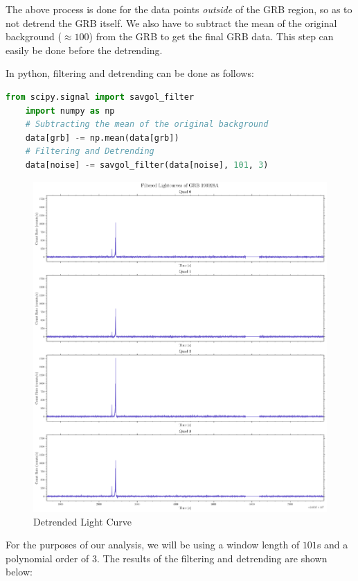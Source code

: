 \documentclass[11pt]{book} %
\begin{document}
The above process is done for the data points \textit{outside} of the GRB region, so as to not detrend the GRB itself. We also have to subtract the mean of the original background ($\approx 100$) from the GRB to get the final GRB data. This step can easily be done before the detrending.

In python, filtering and detrending can be done as follows:

\begin{lstlisting}[language=Python]
    from scipy.signal import savgol_filter
    import numpy as np
    # Subtracting the mean of the original background
    data[grb] -= np.mean(data[grb])
    # Filtering and Detrending
    data[noise] -= savgol_filter(data[noise], 101, 3)
\end{lstlisting}

\begin{figure}
    \centering
    \includegraphics[scale=0.25]{Pictures/detrended.png}
    \caption{Detrended Light Curve}
\end{figure}


For the purposes of our analysis, we will be using a window length of $101$s and a polynomial order of $3$. The results of the filtering and detrending are shown below:
\end{document}
